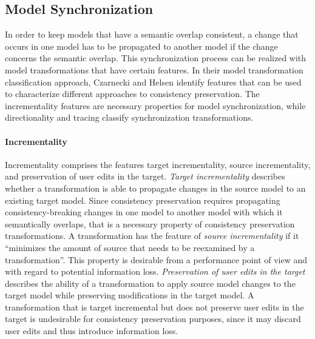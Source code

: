 \subsection{Model Synchronization}
\label{sec:Foundations:ModelSynchronization}
In order to keep models that have a semantic overlap consistent, a change that occurs in one model has to be propagated to another model if the change concerns the semantic overlap. This synchronization process can be realized with model transformations that have certain features. 
In their model transformation classification approach, Czarnecki and Helsen identify features that can be used to characterize different approaches to consistency preservation. \cite{czarnecki_helsen_feature_based_survey_2006}
The incrementality features are necessary properties for model synchronization, while directionality and tracing classify synchronization transformations.

\paragraph{Incrementality} 
Incrementality comprises the features target incrementality, source incrementality, and preservation of user edits in the target.
\emph{Target incrementality} describes whether a transformation is able to propagate changes in the source model to an existing target model. Since consistency preservation requires propagating consistency-breaking changes in one model to another model with which it semantically overlaps, that is a necessary property of consistency preservation transformations.
A transformation has the feature of \emph{source incrementality} if it \enquote{minimizes the amount of source that needs to be reexamined by a transformation}.
This property is desirable from a performance point of view and with regard to potential information loss.
\emph{Preservation of user edits in the target} describes the ability of a transformation to apply source model changes to the target model while preserving modifications in the target model. A transformation that is target incremental but does not preserve user edits in the target is undesirable for consistency preservation purposes, since it may discard user edits and thus introduce information loss.

